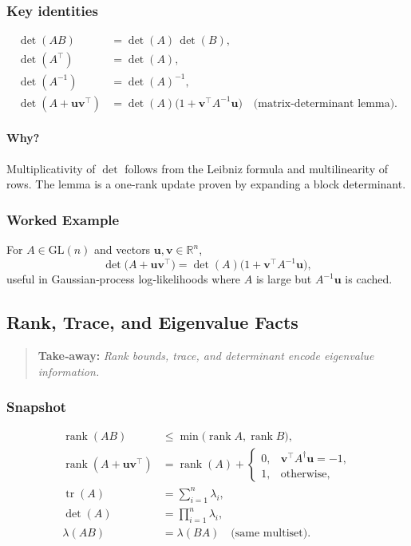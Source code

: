\subsubsection*{Key identities}
\begin{align}
\det(AB) &= \det(A)\,\det(B),\\[4pt]
\det(A^\top) &= \det(A),\\[4pt]
\det(A^{-1}) &= \det(A)^{-1},\\[4pt]
\det(A+\mathbf u\mathbf v^\top) &= \det(A)\bigl(1+\mathbf v^\top A^{-1}\mathbf u\bigr)
\quad\text{(matrix‑determinant lemma)}.
\end{align}

\paragraph{Why?}
Multiplicativity of $\det$ follows from the Leibniz formula and multilinearity of rows.
The lemma is a one‑rank update proven by expanding a block determinant.

\subsubsection*{Worked Example}
For $A\in\mathrm{GL}(n)$ and vectors $\mathbf u,\mathbf v\in\mathbb R^{n}$,
\[
\det\!\bigl(A + \mathbf u\mathbf v^\top\bigr)
      =\det(A)\bigl(1+\mathbf v^\top A^{-1}\mathbf u\bigr),
\]
useful in Gaussian‑process log‑likelihoods where $A$ is large but $A^{-1}\mathbf u$ is cached.

\subsection{Rank, Trace, and Eigenvalue Facts}
\begin{quote}
\textbf{Take‑away:} \emph{Rank bounds, trace, and determinant encode eigenvalue information.}
\end{quote}

\subsubsection*{Snapshot}
\begin{align}
\operatorname{rank}(AB) &\le \min\!\bigl(\operatorname{rank}A,\operatorname{rank}B\bigr),\\[4pt]
\operatorname{rank}(A+\mathbf u\mathbf v^\top)
  &= \operatorname{rank}(A) + 
     \begin{cases}
       0,&\mathbf v^\top A^{\dagger}\mathbf u=-1,\\
       1,&\text{otherwise},
     \end{cases}\\[6pt]
\operatorname{tr}(A)   &= \sum_{i=1}^{n}\lambda_i,\\
\det(A)                &= \prod_{i=1}^{n}\lambda_i,\\
\lambda(AB)            &= \lambda(BA)\quad\text{(same multiset)}.
\end{align}

